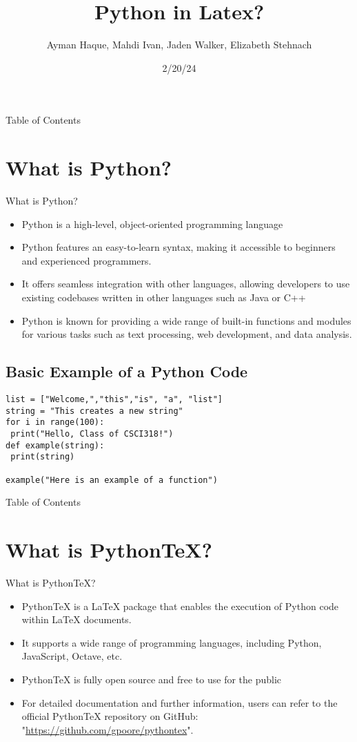 \documentclass[pdf]{beamer}
\title[LaTeX Presentation]{Python in Latex?} %
\author{Ayman Haque, Mahdi Ivan, Jaden Walker, Elizabeth Stehnach}
\date{2/20/24}
\begin{document}
\begin{frame}
 \titlepage
\end{frame}
\begin{frame}{Table of Contents}
 \tableofcontents
\end{frame}
\section{What is Python?}
\begin{frame}{What is Python?}
\begin{itemize}
 \item{Python is a high-level, object-oriented programming language}
 \item {Python features an easy-to-learn syntax, making it accessible to beginners and experienced programmers. }
 \item{It offers seamless integration with other languages, allowing developers to use existing codebases written in other languages such as Java or C++}
 \item{Python is known for providing a wide range of built-in functions and modules for various tasks such as text processing, web development, and data analysis.}
\end{itemize}
\end{frame}
\subsection{Basic Example of a Python Code}

\begin{lstlisting}[caption={Python Example}]
list = ["Welcome,","this","is", "a", "list"]
string = "This creates a new string"
for i in range(100):
 print("Hello, Class of CSCI318!")
def example(string):
 print(string)

example("Here is an example of a function")
\end{lstlisting}
\begin{frame}{Table of Contents}
 \tableofcontents
\end{frame}
\section{What is PythonTeX?}
\begin{frame}{What is PythonTeX?}
\begin{itemize}
 \item{PythonTeX is a LaTeX package that enables the execution of Python code within LaTeX documents. }
 \item{It supports a wide range of programming languages, including Python, JavaScript, Octave, etc.}
 \item{PythonTeX is fully open source and free to use for the public}
 \item{For detailed documentation and further information, users can refer to the official PythonTeX repository on GitHub: "\href{https://github.com/gpoore/pythontex}{https://github.com/gpoore/pythontex}". }
\end{itemize}
\end{frame}
\end{document}
